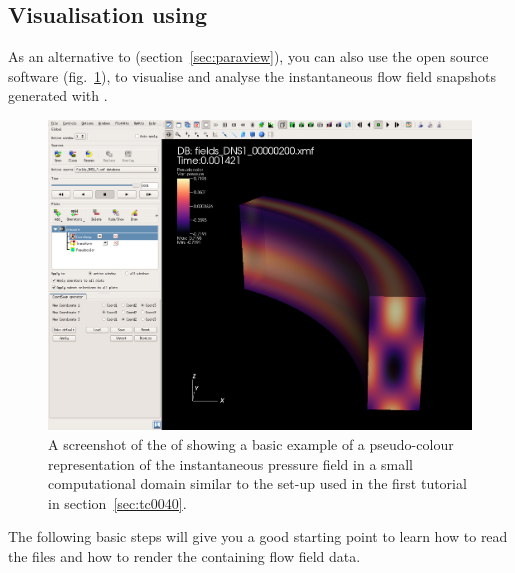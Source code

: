\documentclass[a4paper, 11pt, DIV=11]{scrartcl}
\begin{document}
\subsection{Visualisation using \visit}
\label{sec:visit}
As an alternative to \paraview (section~\ref{sec:paraview}), you can also use
the open source software \visit (fig.~\ref{fig:visit}), to visualise and
analyse the instantaneous flow field snapshots generated with \nsc.
\begin{figure}[htb]
\includegraphics[width=1.00\linewidth]{figures/visit.png}
\caption{A screenshot of the  of \visit showing a basic example
of a pseudo-colour representation of the instantaneous pressure field in
a small computational domain similar to the set-up used in the first
tutorial in section~\ref{sec:tc0040}.}
\label{fig:visit}
\end{figure}
The following basic steps will give you a good starting point to learn
how to read the \hdf files and how to render the containing flow field
data.
\end{document}
